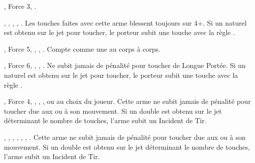 \newpage
\renewcommand{\startarmyarmoury}{\largefontsize}
\startarmyarmoury

\begin{multicols}{2}\raggedcolumns

\subtitle{Armes de Tir}

\startpricelist

\nopricelistitem{\sling} , Force 3, \quicktofire{}.

\nopricelistitem{\gasglobes} , \magicalattacks{}, , \volleyfire{}, \quicktofire{}.\vspace{2pt}\newline
Les touches faites avec cette arme blessent toujours sur 4+. Si un  naturel est obtenu sur le jet pour toucher, le porteur subit une touche avec la règle \toxicattacks{}.

\nopricelistitem{\ratlockpistol} , Force 5, \magicalattacks{}, , \quicktofire{}. \vspace{2pt}\newline
Compte comme une \pw{} au corps à corps.

\nopricelistitem{\jezail} , Force 6, \magicalattacks{}, \unwieldy{}, .\vspace{2pt}\newline
Ne subit jamais de pénalité pour toucher de Longue Portée. Si un  naturel est obtenu sur le jet pour toucher, le porteur subit une touche avec la règle \toxicattacks{}.

\nopricelistitem{\rotarygun} , Force 4, \magicalattacks{}, \volatile{}, \reload{},  ou  au choix du joueur.\vspace{2pt}\newline
Cette arme ne subit jamais de pénalité pour toucher due aux \multipleshots{} ou à son mouvement. Si un double est obtenu sur le jet déterminant le nombre de touches, l'arme subit un Incident de Tir.

\nopricelistitem{\globelauncher} , \magicalattacks{}, \toxicattacks{}, \volatile{}, \reload{}, \volleyfire{}, .\vspace{2pt}\newline
Cette arme ne subit jamais de pénalité pour toucher due aux \multipleshots{} ou à son mouvement. Si un double est obtenu sur le jet déterminant le nombre de touches, l'arme subit un Incident de Tir.


\end{multicols}
